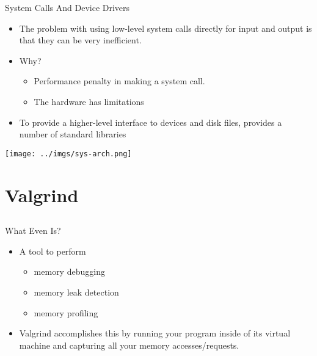 \documentclass{beamer}
\begin{document}
\begin{frame}{System Calls And Device Drivers}
\begin{itemize}
\item The problem with using low-level system calls directly for input and output is that they can be very inefficient.
\item Why?
\begin{itemize}
\item Performance penalty in making a system call.
\item The hardware has limitations
\end{itemize}
\item To provide a higher-level interface to devices and disk files, provides a number of standard libraries
\end{itemize}
\end{frame}

\begin{frame}{}
\texttt{[image: ../imgs/sys-arch.png]}
\end{frame}

\section{Valgrind}
\subsection{}

\begin{frame}{What Even Is?}
\begin{itemize}
\item A tool to perform
\begin{itemize}
\item memory debugging
\item memory leak detection
\item memory profiling
\end{itemize}
\item Valgrind accomplishes this by running your program inside of its virtual machine and capturing all your memory accesses/requests.
\end{itemize}
\end{frame}
\end{document}
